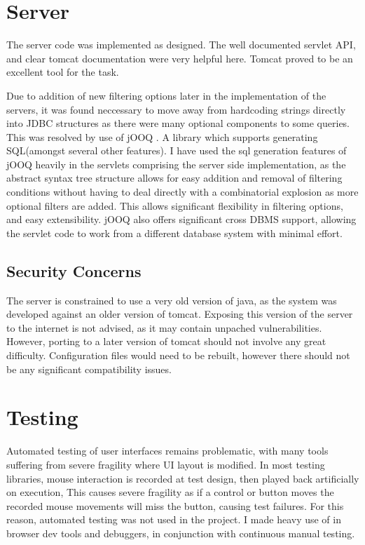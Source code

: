 \section{Server}\label{imp_server}

The server code was implemented as designed. The well documented servlet API, and clear tomcat documentation were very helpful here. Tomcat proved to be an excellent tool for the task.

Due to addition of new filtering options later in the implementation of the servers, it was found neccessary to move away from hardcoding strings directly into JDBC structures
as there were many optional components to some queries. This was resolved by use of jOOQ \cite{jooq2013}. A library which supports generating SQL(amongst several other features). I have used the sql generation features of jOOQ heavily in the servlets comprising the server side implementation, as the abstract syntax tree structure allows for easy addition and removal of filtering conditions without having to deal directly with a combinatorial explosion as more optional filters are added. This allows significant flexibility in filtering options, and easy extensibility. jOOQ also offers significant cross DBMS support, allowing the servlet code to work from a different database system with minimal effort.


\subsection{Security Concerns}
The server is constrained to use a very old version of java, as the system was developed against an older version of tomcat. Exposing this version of the server to the internet is not advised, as it may contain unpached vulnerabilities. However, porting to a later version of tomcat should not involve any great difficulty.  Configuration files would need to be rebuilt, however there should not be any significant compatibility issues.

\section{Testing}
Automated testing of user interfaces remains problematic, with many tools suffering from severe fragility where UI layout is modified. In most testing libraries, mouse interaction is recorded at test design, then played back artificially on execution, This causes severe fragility as if a control or button moves the recorded mouse movements will miss the button, causing test failures. For this reason, automated testing was not used in the project. I made heavy use of in browser dev tools and debuggers, in conjunction with continuous manual testing. 